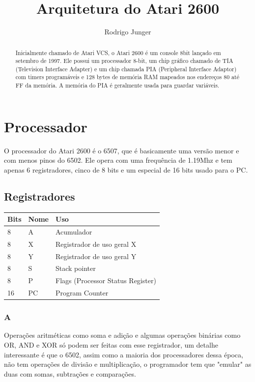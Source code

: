 \documentclass{article}
\title{Arquitetura do Atari 2600}
\author{Rodrigo Junger}
\date{ }
\begin{document}
 
\maketitle
 
\tableofcontents


\renewcommand{\abstractname}{Introdução}
\begin{abstract}
Inicialmente chamado de Atari VCS, o Atari 2600 é um console 8bit lançado em setembro de 1997. Ele possui um processador 8-bit, um chip gráfico chamado de TIA (Television Interface Adapter) e um chip chamada PIA (Peripheral Interface Adaptor) com timers programáveis e 128 bytes de memória RAM mapeados nos endereços 80 até FF da memória. A memória do PIA é geralmente usada para guardar variáveis.
\end{abstract}

\section{Processador}
\paragraph{}
O processador do Atari 2600 é o 6507, que é basicamente uma versão menor e com menos pinos do 6502. Ele opera com uma frequência de 1.19Mhz e tem apenas 6 registradores, cinco de 8 bits e um especial de 16 bits usado para o PC.

\subsection{Registradores}

\begin{center}
	\begin{tabular}{| l | l | l |}
	\hline
	Bits & Nome & Uso \\ \hline
	8 & A & Acumulador \\ \hline
	8 & X & Registrador de uso geral X \\ \hline
	8 & Y & Registrador de uso geral Y \\ \hline
	8 & S & Stack pointer \\ \hline
	8 & P & Flags (Processor Status Register) \\ \hline
	16 & PC & Program Counter \\ \hline
	\end{tabular}
\end{center}

\subsubsection{A}
Operações aritméticas como soma e adição e algumas operações binárias como OR, AND e XOR só podem ser feitas com esse registrador, um detalhe interessante é que o 6502, assim como a maioria dos processadores dessa época, não tem operações de divisão e multiplicação, o programador tem que "emular" as duas com somas, subtrações e comparações.
\end{document}
